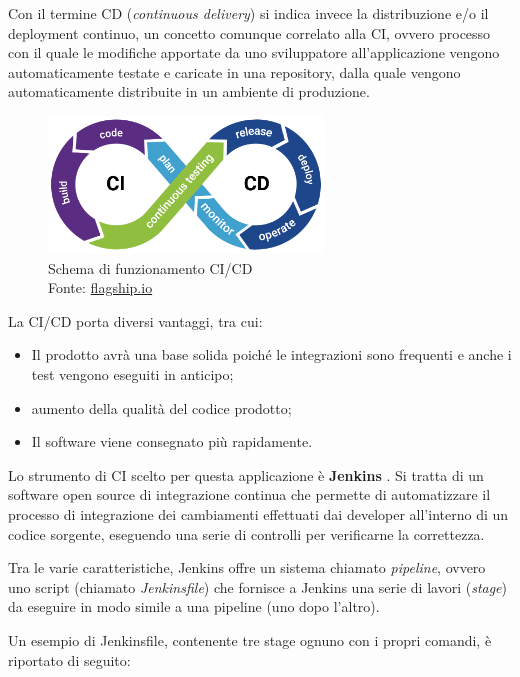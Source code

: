Con il termine CD (\textit{continuous delivery}) si indica invece la distribuzione e/o il deployment continuo, un concetto comunque correlato alla CI, ovvero processo con il quale le modifiche apportate da uno sviluppatore all'applicazione vengono automaticamente testate e caricate in una repository, dalla quale vengono automaticamente distribuite in un ambiente di produzione. \cite{cicd}

\begin{figure}[H]
\centering
\includegraphics[width=0.65\textwidth,height=\textheight,keepaspectratio]{img/ci}
\caption{Schema di funzionamento CI/CD\\Fonte: \url{flagship.io}}
\label{fig:cicd}
\end{figure}

La CI/CD porta diversi vantaggi, tra cui:
\begin{itemize}
  \item Il prodotto avrà una base solida poiché le integrazioni sono frequenti e anche i test vengono eseguiti in anticipo;
  \item aumento della qualità del codice prodotto;
  \item Il software viene consegnato più rapidamente.
\end{itemize}

Lo strumento di CI scelto per questa applicazione è \textbf{Jenkins} \cite{jenkins}. Si tratta di un software open source di integrazione continua che permette di automatizzare il processo di integrazione dei cambiamenti effettuati dai developer all'interno di un codice sorgente, eseguendo una serie di controlli per verificarne la correttezza.

Tra le varie caratteristiche, Jenkins offre un sistema chiamato \textit{pipeline}, ovvero uno script (chiamato \textit{Jenkinsfile}) che fornisce a Jenkins una serie di lavori (\textit{stage}) da eseguire in modo simile a una pipeline (uno dopo l'altro).

Un esempio di Jenkinsfile, contenente tre stage ognuno con i propri comandi, è riportato di seguito:

